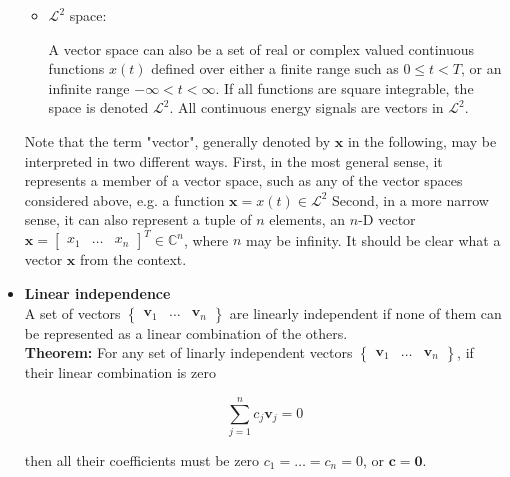 \documentclass[10pt,b5paper,titlepage]{book}
\begin{document}
\begin{itemize}
\begin{itemize}
            \item $\mathcal{L}^{2}$ space:

                A vector space can also be a set of real or complex valued continuous functions
                $x(t)$ defined over either a finite range such as $0 \le t < T$,
                or an infinite range $-\infty < t < \infty$. If all functions are
                square integrable, the space is denoted $\mathcal{L}^{2}$. All
                continuous energy signals are vectors in $\mathcal{L}^{2}$.
        \end{itemize}

        Note that the term "vector", generally denoted by $\mathbf{x}$ in the following,
        may be interpreted in two different ways. First, in the most general sense,
        it represents a member of a vector space, such as any of the vector spaces
        considered above, e.g. a function $\mathbf{x} = x (t) \in \mathcal{L}^{2}$
        Second, in a more narrow sense, it can also represent a tuple of $n$ elements,
        an $n$-D vector $\mathbf{x} = \begin{bmatrix} x_1 & \ldots & x_n \end{bmatrix}^{T} \in \mathbb{C}^{n}$,
        where $n$ may be infinity. It should be clear what a vector $\mathbf{x}$
        from the context.

    \item \textbf{Linear independence}\\

        A set of vectors $\begin{Bmatrix} \mathbf{v}_1 & \ldots & \mathbf{v}_n \end{Bmatrix}$
        are linearly independent if none of them can be represented as a linear
        combination of the others.\\

        \textbf{Theorem:} For any set of linarly independent vectors
        $\begin{Bmatrix} \mathbf{v}_1 & \ldots & \mathbf{v}_n \end{Bmatrix}$,
        if their linear combination is zero

        \begin{equation}
            \sum_{j=1}^{n} c_{j} \mathbf{v}_{j} = 0
        \end{equation}

        then all their coefficients must be zero $c_1 = \ldots = c_{n} = 0$,
        or $\mathbf{c} = \mathbf{0}$.


\end{itemize}
\end{document}
